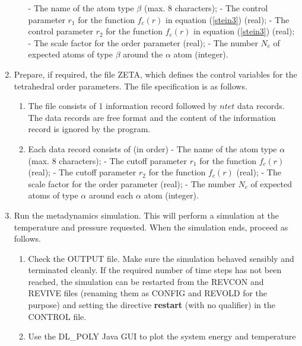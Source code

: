 \begin{enumerate}
\begin{enumerate}
  - The name of the atom type $\beta$ (max. 8 characters); \newline
  - The control parameter $r_{1}$ for the function $f_{c}(r)$ in
    equation (\ref{stein3}) (real); \newline
  - The control parameter $r_{2}$ for the function $f_{c}(r)$ in
    equation (\ref{stein3}) (real); \newline
  - The scale factor for the order parameter (real); \newline
  - The number $N_{c}$ of expected atoms of type $\beta$ around the $\alpha$
  atom (integer). 
\end{enumerate}
\item Prepare, if required, the file ZETA, which defines the 
  control variables for the tetrahedral order parameters. The file 
  specification is as follows. 
\begin{enumerate}
\item The file consists of 1 information record followed by $ntet$ data 
  records. The data records are free format and the content of the information
  record is ignored by the program.
\item Each data record consists of (in order)\newline
  - The name of the atom type $\alpha$ (max. 8 characters); \newline
  - The cutoff parameter $r_{1}$ for the function $f_{c}(r)$ (real); \newline
  - The cutoff parameter $r_{2}$ for the function $f_{c}(r)$ (real); \newline
  - The scale factor for the order parameter (real); \newline
  - The number $N_{c}$ of expected atoms of type $\alpha$ around each
    $\alpha$ atom (integer). 
\end{enumerate}
\item Run the metadynamics simulation. This will perform a simulation at the
   temperature and pressure requested. When the simulation ends, proceed 
   as follows.
\begin{enumerate}
\item Check the OUTPUT file. Make sure the simulation behaved sensibly and
  terminated cleanly. If the required number of time steps has not been 
  reached, the simulation can be restarted from the REVCON and REVIVE files
  (renaming them as CONFIG and REVOLD for the purpose) and
  setting the directive {\bf restart} (with no qualifier) in the CONTROL
  file.
\item Use the DL\_POLY Java GUI to plot the system energy and temperature

\end{enumerate}
\end{enumerate}
